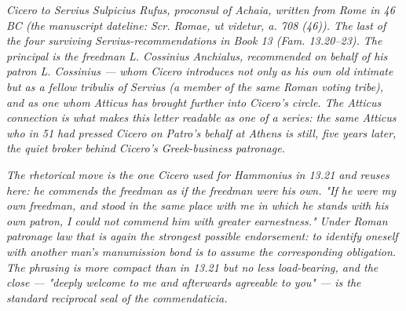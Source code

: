 
\textit{Cicero to Servius Sulpicius Rufus, proconsul of
Achaia, written from Rome in 46 BC (the manuscript
dateline: \textit{Scr. Romae, ut videtur, a. 708 (46)}).
The last of the four surviving Servius-recommendations
in Book 13 (Fam. 13.20--23). The principal is the
freedman L. Cossinius Anchialus, recommended on behalf
of his patron L. Cossinius --- whom Cicero introduces
not only as his own old intimate but as a fellow
\textit{tribulis} of Servius (a member of the same
Roman voting tribe), and as one whom Atticus has
brought further into Cicero's circle. The Atticus
connection is what makes this letter readable as one
of a series: the same Atticus who in 51 had pressed
Cicero on Patro's behalf at Athens is still, five years
later, the quiet broker behind Cicero's Greek-business
patronage.}

\textit{The rhetorical move is the one Cicero used for
Hammonius in 13.21 and reuses here: he commends the
freedman as if the freedman were his own. "If he were
my own freedman, and stood in the same place with me in
which he stands with his own patron, I could not commend
him with greater earnestness." Under Roman patronage
law that is again the strongest possible endorsement:
to identify oneself with another man's manumission bond
is to assume the corresponding obligation. The phrasing
is more compact than in 13.21 but no less load-bearing,
and the close --- "deeply welcome to me and afterwards
agreeable to you" --- is the standard reciprocal seal of
the \textit{commendaticia}.}
